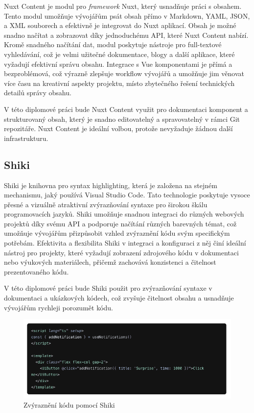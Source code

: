 Nuxt Content je modul pro \emph{framework} Nuxt, který usnadňuje práci s obsahem. Tento modul umožňuje vývojářům psát obsah přímo v Markdown, YAML, JSON, a XML souborech a efektivně je integrovat do Nuxt aplikací. Obsah je možné snadno načítat a zobrazovat díky jednoduchému API, které Nuxt Content nabízí. Kromě snadného načítání dat, modul poskytuje nástroje pro full-textové vyhledávání, což je velmi užitečné dokumentace, blogy a další aplikace, které vyžadují efektivní správu obsahu. Integrace s Vue komponentami je přímá a bezproblémová, což výrazně zlepšuje workflow vývojářů a umožňuje jim věnovat více času na kreativní aspekty projektu, místo zbytečného řešení technických detailů správy obsahu.

V této diplomové práci bude Nuxt Content využit pro dokumentaci komponent a strukturovaný obsah, který je snadno editovatelný a spravovatelný v rámci Git repozitáře. Nuxt Content je ideální volbou, protože nevyžaduje žádnou další infrastrukturu.

\subsection{Shiki}
Shiki je knihovna pro syntax highlighting, která je založena na stejném mechanismu, jaký používá Visual Studio Code. Tato technologie poskytuje vysoce přesné a vizuálně atraktivní zvýrazňování syntaxe pro širokou škálu programovacích jazyků. Shiki umožňuje snadnou integraci do různých webových projektů díky svému API a podporuje načítání různých barevných témat, což umožňuje vývojářům přizpůsobit vzhled zvýraznění kódu svým specifickým potřebám. Efektivita a flexibilita Shiki v integraci a konfiguraci z něj činí ideální nástroj pro projekty, které vyžadují zobrazení zdrojového kódu v dokumentaci nebo výukových materiálech, přičemž zachovává konzistenci a čitelnost prezentovaného kódu. \cite{Shiki}

V této diplomové práci bude Shiki použit pro zvýrazňování syntaxe v dokumentaci a ukázkových kódech, což zvyšuje čitelnost obsahu a usnadňuje vývojářům rychleji porozumět kódu.

\begin{figure}[H]
  \includegraphics[width=\textwidth]{images/shiki}
  \caption{Zvýraznění kódu pomocí Shiki} \label{picture:shiki}
\end{figure}

